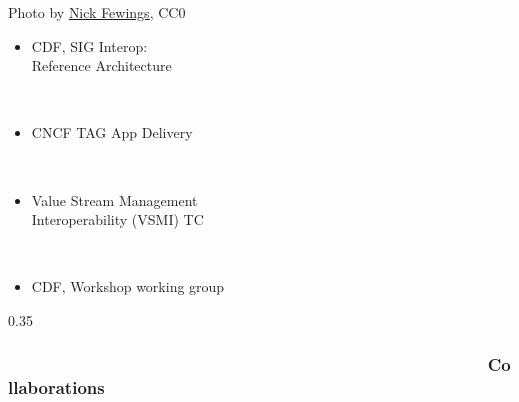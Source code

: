 \documentclass[aspectratio=169,11pt,hyperref={colorlinks=true}]{beamer}
\begin{document}
\begin{lpicrblack}{%
  Photo by \href{https://unsplash.com/@jannerboy62}{\underline{Nick Fewings}}, CC0
  }%
  {%
  \begin{itemize}
    \item CDF, SIG Interop:\\
    Reference Architecture
  \end{itemize}
  ~ \\
  \begin{itemize}
    \item CNCF TAG App Delivery
  \end{itemize}
  ~ \\
  \begin{itemize}
    \item Value Stream Management\\
          Interoperability (VSMI) TC
  \end{itemize}
  ~ \\
  \begin{itemize}
    \item CDF, Workshop working group
  \end{itemize}
  }%
  {0.35}
  \frametitle{~~~~~~~~~~~~~~~~~~~~~~~~~~~~~~~~~~~~~~~~~~~~~~~~~~~Collaborations}
\end{lpicrblack}
\end{document}
